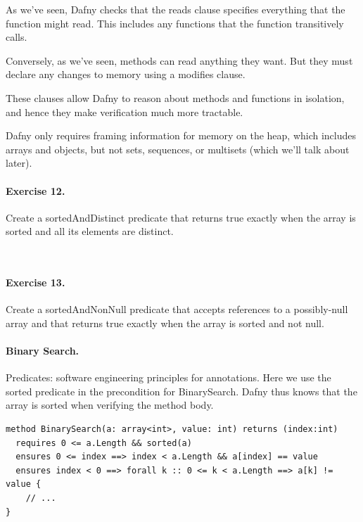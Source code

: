\documentclass[11pt]{article}
\begin{document}
As we've seen, Dafny checks that the \textsf{reads} clause
specifies everything that the function might read. This includes
any functions that the function transitively calls.

Conversely, as we've seen, methods can read anything they want.
But they must declare any changes to memory using a \textsf{modifies}
clause.

These clauses allow Dafny to reason about methods and functions
in isolation, and hence they make verification much more tractable.

Dafny only requires framing information for memory on the heap,
which includes arrays and objects, but not sets, sequences, or multisets
(which we'll talk about later).

\paragraph{Exercise 12.} Create a \textsf{sortedAndDistinct}
predicate that returns true exactly when the array is sorted and all its
elements are distinct.

~\\[-5em]
\paragraph{Exercise 13.} Create a \textsf{sortedAndNonNull}
predicate that accepts references to a possibly-null array and that
returns true exactly when the array is sorted and not null.

\paragraph{Binary Search.} Predicates: software engineering principles for
annotations. Here we use the \textsf{sorted} predicate in the precondition
for \textsf{BinarySearch}. Dafny thus knows that the array is sorted
when verifying the method body.

\begin{lstlisting}[language=dafny]
method BinarySearch(a: array<int>, value: int) returns (index:int)
  requires 0 <= a.Length && sorted(a)
  ensures 0 <= index ==> index < a.Length && a[index] == value
  ensures index < 0 ==> forall k :: 0 <= k < a.Length ==> a[k] != value {
    // ...
}
\end{lstlisting}
\end{document}
